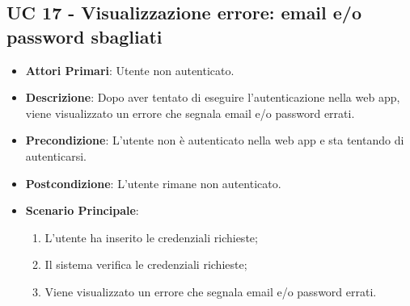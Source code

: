
		


		


		 


		\subsection{UC 17 - Visualizzazione errore: email e/o password sbagliati}
		\begin{itemize}
			\item \textbf{Attori Primari}: Utente non autenticato.
			\item \textbf{Descrizione}: Dopo aver tentato di eseguire l'autenticazione nella web app, viene visualizzato un errore che segnala email e/o password errati.
			\item \textbf{Precondizione}: L'utente non è autenticato nella web app e sta tentando di autenticarsi.
			\item \textbf{Postcondizione}: L'utente rimane non autenticato.
			\item \textbf{Scenario Principale}:
			\begin{enumerate}
				\item L'utente ha inserito le credenziali richieste;
				\item Il sistema verifica le credenziali richieste;
				\item Viene visualizzato un errore che segnala email e/o password errati.
			\end{enumerate}
		\end{itemize}


